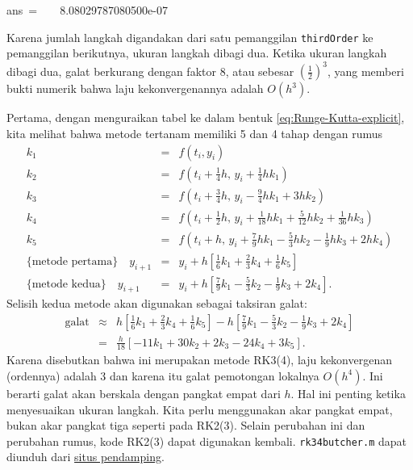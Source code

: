\begin{description}
\begin{lyxcode}
ans~=~~~~8.08029787080500e-07
\end{lyxcode}
Karena jumlah langkah digandakan dari satu pemanggilan \texttt{thirdOrder}
ke pemanggilan berikutnya, ukuran langkah dibagi dua. Ketika ukuran
langkah dibagi dua, galat berkurang dengan faktor 8, atau sebesar
$(\frac{1}{2})^{3}$, yang memberi bukti numerik bahwa laju kekonvergenannya
adalah $O(h^{3})$.
\item [{\ref{exc:ode-adaptive-12}:}] Pertama, dengan menguraikan tabel
ke dalam bentuk \ref{eq:Runge-Kutta-explicit}, kita melihat bahwa
metode tertanam memiliki 5 dan 4 tahap dengan rumus
\begin{eqnarray*}
k_{1} & = & f(t_{i},y_{i})\\
k_{2} & = & f\left(t_{i}+\frac{1}{4}h,\,y_{i}+\frac{1}{4}hk_{1}\right)\\
k_{3} & = & f\left(t_{i}+\frac{3}{4}h,\,y_{i}-\frac{9}{4}hk_{1}+3hk_{2}\right)\\
k_{4} & = & f\left(t_{i}+\frac{1}{2}h,\,y_{i}+\frac{1}{18}hk_{1}+\frac{5}{12}hk_{2}+\frac{1}{36}hk_{3}\right)\\
k_{5} & = & f\left(t_{i}+h,\,y_{i}+\frac{7}{9}hk_{1}-\frac{5}{3}hk_{2}-\frac{1}{9}hk_{3}+2hk_{4}\right)\\
\{\mbox{metode pertama}\}\quad y_{i+1} & = & y_{i}+h\left[\frac{1}{6}k_{1}+\frac{2}{3}k_{4}+\frac{1}{6}k_{5}\right]\\
\{\mbox{metode kedua}\}\quad y_{i+1} & = & y_{i}+h\left[\frac{7}{9}k_{1}-\frac{5}{3}k_{2}-\frac{1}{9}k_{3}+2k_{4}\right].
\end{eqnarray*}
Selisih kedua metode akan digunakan sebagai taksiran galat:
\begin{eqnarray*}
\mbox{galat} & \approx & h\left[\frac{1}{6}k_{1}+\frac{2}{3}k_{4}+\frac{1}{6}k_{5}\right]-h\left[\frac{7}{9}k_{1}-\frac{5}{3}k_{2}-\frac{1}{9}k_{3}+2k_{4}\right]\\
 & = & \frac{h}{18}\left[-11k_{1}+30k_{2}+2k_{3}-24k_{4}+3k_{5}\right].
\end{eqnarray*}
Karena disebutkan bahwa ini merupakan metode RK3(4), laju kekonvergenan
(ordennya) adalah 3 dan karena itu galat pemotongan lokalnya $O(h^{4})$.
Ini berarti galat akan berskala dengan pangkat empat dari $h$. Hal
ini penting ketika menyesuaikan ukuran langkah. Kita perlu menggunakan
akar pangkat empat, bukan akar pangkat tiga seperti pada RK2(3). Selain
perubahan ini dan perubahan rumus, kode RK2(3) dapat digunakan kembali.
\texttt{rk34butcher.m} dapat diunduh dari \href{http://lqbrin.github.io/tea-time-numerical/ancillaries.html}{situs pendamping}.


\end{description}
